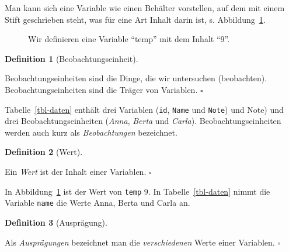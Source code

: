 \documentclass[
  letterpaper,
  twoside,
  open=any]{scrbook}
\theoremstyle{definition}
\newtheorem{definition}{Definition}[chapter]
\theoremstyle{definition}
\theoremstyle{definition}
\theoremstyle{remark}
\begin{document}
Man kann sich eine Variable wie einen Behälter vorstellen, auf dem mit
einem Stift geschrieben steht, was für eine Art Inhalt darin ist, s.
Abbildung~\ref{fig-var-zuweisen}.

\begin{figure}


\caption{\label{fig-var-zuweisen}Wir definieren eine Variable
\enquote{temp} mit dem Inhalt \enquote{9}.}

\end{figure}%

\begin{definition}[Beobachtungseinheit]\protect\hypertarget{def-beobeinheit}{}\label{def-beobeinheit}

Beobachtungseinheiten sind die Dinge, die wir untersuchen (beobachten).
Beobachtungseinheiten sind die Träger von Variablen. \(\square\)

\end{definition}

Tabelle~\ref{tbl-daten} enthält drei Variablen (\texttt{id},
\texttt{Name} und \texttt{Note}) und Note) und drei
Beobachtungseinheiten (\emph{Anna}, \emph{Berta} und \emph{Carla}).
Beobachtungseinheiten werden auch kurz als \emph{Beobachtungen}
bezeichnet.

\begin{definition}[Wert]\protect\hypertarget{def-wert}{}\label{def-wert}

Ein \emph{Wert} ist der Inhalt einer Variablen. \(\square\)

\end{definition}

In Abbildung~\ref{fig-var-zuweisen} ist der Wert von \texttt{temp} 9. In
Tabelle~\ref{tbl-daten} nimmt die Variable \texttt{name} die Werte Anna,
Berta und Carla an.

\begin{definition}[Ausprägung]\protect\hypertarget{def-auspraegung}{}\label{def-auspraegung}

Als \emph{Ausprägungen} bezeichnet man die \emph{verschiedenen} Werte
einer Variablen. \(\square\)

\end{definition}
\end{document}
